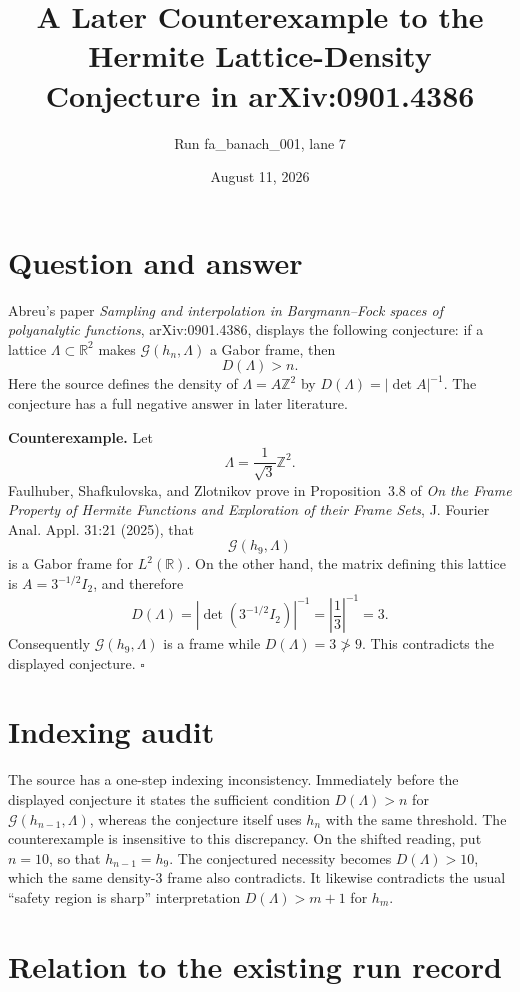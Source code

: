 \documentclass[11pt]{article}
\title{A Later Counterexample to the Hermite Lattice-Density Conjecture in arXiv:0901.4386}
\author{Run fa\_banach\_001, lane 7}
\date{August 11, 2026}
\newcommand{\R}{\mathbb R}
\newcommand{\Z}{\mathbb Z}
\newcommand{\cG}{\mathcal G}
\begin{document}
\maketitle

\section{Question and answer}

Abreu's paper \emph{Sampling and interpolation in Bargmann--Fock spaces of
polyanalytic functions}, arXiv:0901.4386, displays the following conjecture:
if a lattice $\Lambda\subset\R^2$ makes $\cG(h_n,\Lambda)$ a Gabor frame,
then
\[
  D(\Lambda)>n.
\]
Here the source defines the density of $\Lambda=A\Z^2$ by
$D(\Lambda)=|\det A|^{-1}$.  The conjecture has a full negative answer in
later literature.

\medskip
\noindent\textbf{Counterexample.}
Let
\[
  \Lambda=\frac1{\sqrt3}\Z^2.
\]
Faulhuber, Shafkulovska, and Zlotnikov prove in Proposition~3.8 of
\emph{On the Frame Property of Hermite Functions and Exploration of their
Frame Sets}, J. Fourier Anal. Appl. 31:21 (2025), that
\[
  \cG(h_9,\Lambda)
\]
is a Gabor frame for $L^2(\R)$.  On the other hand, the matrix defining this
lattice is $A=3^{-1/2}I_2$, and therefore
\[
  D(\Lambda)
  =|\det(3^{-1/2}I_2)|^{-1}
  =\left|\frac13\right|^{-1}
  =3.
\]
Consequently $\cG(h_9,\Lambda)$ is a frame while $D(\Lambda)=3\not>9$.
This contradicts the displayed conjecture. \hfill$\square$

\section{Indexing audit}

The source has a one-step indexing inconsistency.  Immediately before the
displayed conjecture it states the sufficient condition $D(\Lambda)>n$ for
$\cG(h_{n-1},\Lambda)$, whereas the conjecture itself uses $h_n$ with the
same threshold.  The counterexample is insensitive to this discrepancy.  On
the shifted reading, put $n=10$, so that $h_{n-1}=h_9$.  The conjectured
necessity becomes $D(\Lambda)>10$, which the same density-$3$ frame also
contradicts.  It likewise contradicts the usual ``safety region is sharp''
interpretation $D(\Lambda)>m+1$ for $h_m$.

\section{Relation to the existing run record}
\end{document}
